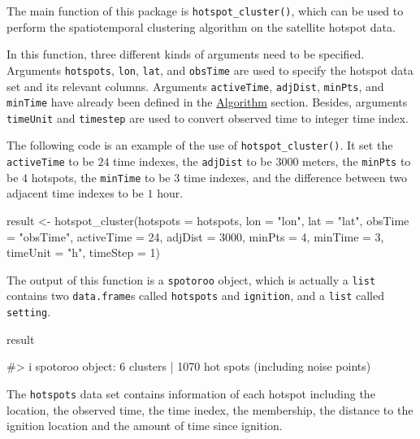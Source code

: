 The main function of this package is \texttt{hotspot\_cluster()}, which
can be used to perform the spatiotemporal clustering algorithm on the
satellite hotspot data.

In this function, three different kinds of arguments need to be
specified. Arguments \texttt{hotspots}, \texttt{lon}, \texttt{lat}, and
\texttt{obsTime} are used to specify the hotspot data set and its
relevant columns. Arguments \texttt{activeTime}, \texttt{adjDist},
\texttt{minPts}, and \texttt{minTime} have already been defined in the
\protect\hyperlink{algorithm}{Algorithm} section. Besides, arguments
\texttt{timeUnit} and \texttt{timestep} are used to convert observed
time to integer time index.

The following code is an example of the use of
\texttt{hotspot\_cluster()}. It set the \texttt{activeTime} to be \(24\)
time indexes, the \texttt{adjDist} to be \(3000\) meters, the
\texttt{minPts} to be \(4\) hotspots, the \texttt{minTime} to be \(3\)
time indexes, and the difference between two adjacent time indexes to be
\(1\) hour.

\begin{Schunk}
\begin{Sinput}
result <- hotspot_cluster(hotspots = hotspots,
                          lon = "lon",
                          lat = "lat",
                          obsTime = "obsTime",
                          activeTime = 24,
                          adjDist = 3000,
                          minPts = 4,
                          minTime = 3,
                          timeUnit = "h",
                          timeStep = 1)
\end{Sinput}
\end{Schunk}

The output of this function is a \texttt{spotoroo} object, which is
actually a \texttt{list} contains two \texttt{data.frame}s called
\texttt{hotspots} and \texttt{ignition}, and a \texttt{list} called
\texttt{setting}.

\begin{Schunk}
\begin{Sinput}
result
\end{Sinput}
\begin{Soutput}
#> i spotoroo object: 6 clusters | 1070 hot spots (including noise points)
\end{Soutput}
\end{Schunk}

The \texttt{hotspots} data set contains information of each hotspot
including the location, the observed time, the time inedex, the
membership, the distance to the ignition location and the amount of time
since ignition.

